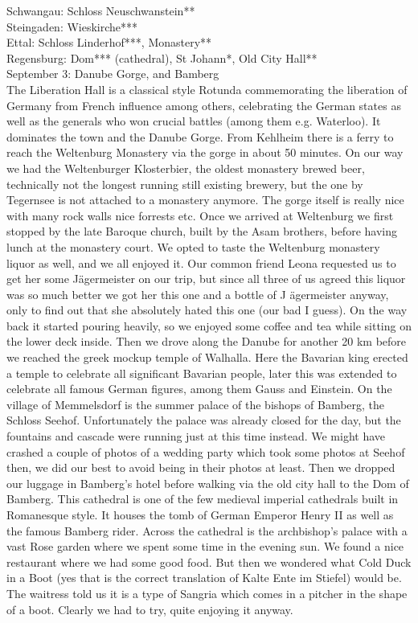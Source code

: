 Schwangau: Schloss Neuschwanstein**\\
Steingaden: Wieskirche***\\
Ettal: Schloss Linderhof***, Monastery**\\
Regensburg: Dom*** (cathedral), St Johann*, Old City Hall**\\

September 3: Danube Gorge, and Bamberg\\
The Liberation Hall is a classical style Rotunda commemorating the liberation of Germany from French influence among others, celebrating the German states as well as the generals who won crucial battles (among them e.g. Waterloo). It dominates the town and the Danube Gorge. From Kehlheim there is a ferry to reach the Weltenburg Monastery via the gorge in about 50 minutes. On our way we had the Weltenburger Klosterbier, the oldest monastery brewed beer, technically not the longest running still existing brewery, but the one by Tegernsee is not attached to a monastery anymore. The gorge itself is really nice with many rock walls nice forrests etc. Once we arrived at Weltenburg we first stopped by the late Baroque church, built by the Asam brothers, before having lunch at the monastery court. We opted to taste the Weltenburg monastery liquor as well, and we all enjoyed it. Our common friend Leona requested us to get her some J\"agermeister on our trip, but since all three of us agreed this liquor was so much better we got her this one and a bottle of J
\"agermeister anyway, only to find out that she absolutely hated this one (our bad I guess). On the way back it started pouring heavily, so we enjoyed some coffee and tea while sitting on the lower deck inside. Then we drove along the Danube for another 20 km before we reached the greek mockup temple of Walhalla. Here the Bavarian king erected a temple to celebrate all significant Bavarian people, later this was extended to celebrate all famous German figures, among them Gauss and Einstein. On the village of Memmelsdorf is the summer palace of the bishops of Bamberg, the Schloss Seehof. Unfortunately the palace was already closed for the day, but the fountains and cascade were running just at this time instead. We might have crashed a couple of photos of a wedding party which took some photos at Seehof then, we did our best to avoid being in their photos at least. Then we dropped our luggage in Bamberg's hotel before walking via the old city hall to the Dom of Bamberg. This cathedral is one of the few medieval imperial cathedrals built in Romanesque style. It houses the tomb of German Emperor Henry II as well as the famous Bamberg rider. Across the cathedral is the archbishop's palace with a vast Rose garden where we spent some time in the evening sun. We found a nice restaurant where we had some good food. But then we wondered what Cold Duck in a Boot (yes that is the correct translation of Kalte Ente im Stiefel) would be. The waitress told us it is a type of Sangria which comes in a pitcher in the shape of a boot. Clearly we had to try, quite enjoying it anyway.\\

